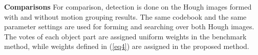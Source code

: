 \textbf{Comparisons} For comparison, detection is done on the Hough images formed with and without motion grouping results. The same codebook and the same parameter settings are used for forming and searching over both Hough images. The votes of each object part are assigned uniform weights in the benchmark method, while weights defined in (\ref{eq4}) are assigned in the proposed method.
\begin{figure}
\centering
{}
\end{figure}

